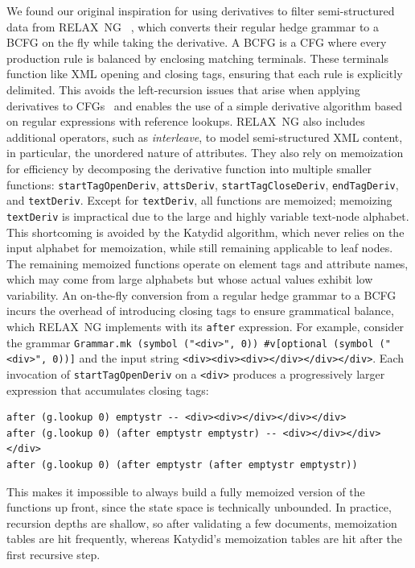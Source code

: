 \documentclass[runningheads]{llncs}
\newcommand{\RelaxNG}{%
  RELAX~NG\xspace%
}
\newcommand{\BCFG}{\ac{BCFG}\xspace}
\newcommand{\CFG}{\ac{CFG}\xspace}
\newcommand{\CFGs}{\acp{CFG}\xspace}
\newcommand{\XML}{\ac{XML}\xspace}
\begin{document}
We found our original inspiration for using derivatives to filter semi-structured data from \RelaxNG~\cite{relaxng2001simple}, which converts their regular hedge grammar to a \BCFG on the fly while taking the derivative.
A \BCFG is a \CFG where every production rule is balanced by enclosing matching terminals.
These terminals function like \XML opening and closing tags, ensuring that each rule is explicitly delimited.
This avoids the left-recursion issues that arise when applying derivatives to \CFGs~\cite{might2011parsing} and enables the use of a simple derivative algorithm based on regular expressions with reference lookups.
\RelaxNG also includes additional operators, such as \emph{interleave}, to model semi-structured \XML content, in particular, the unordered nature of attributes.
They also rely on memoization for efficiency by decomposing the derivative function into multiple smaller functions: \lstinline{startTagOpenDeriv}, \lstinline{attsDeriv}, \lstinline{startTagCloseDeriv}, \lstinline{endTagDeriv}, and \lstinline{textDeriv}.
Except for \lstinline{textDeriv}, all functions are memoized; memoizing \lstinline{textDeriv} is impractical due to the large and highly variable text-node alphabet.
This shortcoming is avoided by the Katydid algorithm, which never relies on the input alphabet for memoization, while still remaining applicable to leaf nodes.
The remaining memoized functions operate on element tags and attribute names, which may come from large alphabets but whose actual values exhibit low variability.
An on-the-fly conversion from a regular hedge grammar to a \BCFG incurs the overhead of introducing closing tags to ensure grammatical balance, which \RelaxNG implements with its \lstinline{after} expression.
For example, consider the grammar \lstinline{Grammar.mk (symbol ("<div>", 0)) #v[optional (symbol ("<div>", 0))]} and the input string \lstinline{<div><div><div></div></div></div>}.
Each invocation of \lstinline{startTagOpenDeriv} on a \lstinline{<div>} produces a progressively larger expression that accumulates closing tags:
\begin{lstlisting}
after (g.lookup 0) emptystr -- <div><div></div></div></div>
after (g.lookup 0) (after emptystr emptystr) -- <div></div></div></div>
after (g.lookup 0) (after emptystr (after emptystr emptystr))
\end{lstlisting}
This makes it impossible to always build a fully memoized version of the functions up front, since the state space is technically unbounded.
In practice, recursion depths are shallow, so after validating a few documents, memoization tables are hit frequently, whereas Katydid's memoization tables are hit after the first recursive step.
\end{document}

